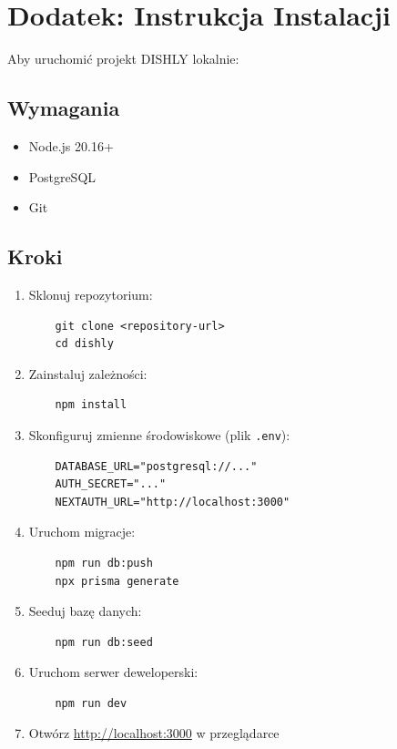 \documentclass[12pt,a4paper,utf-8]{article}
\begin{document}
\newpage

\section{Dodatek: Instrukcja Instalacji}

Aby uruchomić projekt DISHLY lokalnie:

\subsection{Wymagania}

\begin{itemize}
    \item Node.js 20.16+
    \item PostgreSQL
    \item Git
\end{itemize}

\subsection{Kroki}

\begin{enumerate}
    \item Sklonuj repozytorium:
    \begin{verbatim}
    git clone <repository-url>
    cd dishly
    \end{verbatim}
    
    \item Zainstaluj zależności:
    \begin{verbatim}
    npm install
    \end{verbatim}
    
    \item Skonfiguruj zmienne środowiskowe (plik \texttt{.env}):
    \begin{verbatim}
    DATABASE_URL="postgresql://..."
    AUTH_SECRET="..."
    NEXTAUTH_URL="http://localhost:3000"
    \end{verbatim}
    
    \item Uruchom migracje:
    \begin{verbatim}
    npm run db:push
    npx prisma generate
    \end{verbatim}
    
    \item Seeduj bazę danych:
    \begin{verbatim}
    npm run db:seed
    \end{verbatim}
    
    \item Uruchom serwer deweloperski:
    \begin{verbatim}
    npm run dev
    \end{verbatim}
    
    \item Otwórz \href{http://localhost:3000}{http://localhost:3000} w przeglądarce
\end{enumerate}
\end{document}
